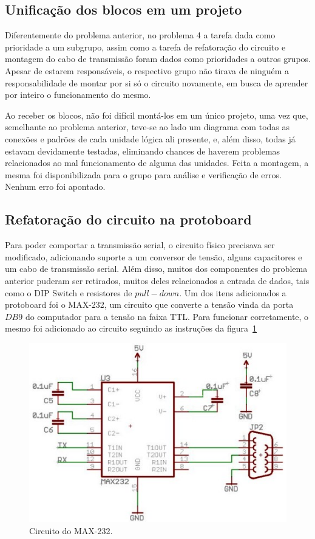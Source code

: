 \documentclass[12pt]{article}
\begin{document}
\subsection{Unificação dos blocos em um projeto}

Diferentemente do problema anterior, no problema 4 a tarefa dada como prioridade a um subgrupo, assim como a tarefa de refatoração do circuito e montagem do cabo de transmissão foram dados como prioridades a outros grupos. Apesar de estarem responsáveis, o respectivo grupo não tirava de ninguém a responsabilidade de montar por si só o circuito novamente, em busca de aprender por inteiro o funcionamento do mesmo.

Ao receber os blocos, não foi difícil montá-los em um único projeto, uma vez que, semelhante ao problema anterior, teve-se ao lado um diagrama com todas as conexões e padrões de cada unidade lógica ali presente, e, além disso, todas já estavam devidamente testadas, eliminando chances de haverem problemas relacionados ao mal funcionamento de alguma das unidades. Feita a montagem, a mesma foi disponibilizada para o grupo para análise e verificação de erros. Nenhum erro foi apontado.

\subsection{Refatoração do circuito na protoboard}

Para poder comportar a transmissão serial, o circuito físico precisava ser modificado, adicionando suporte a um conversor de tensão, alguns capacitores e um cabo de transmissão serial. Além disso, muitos dos componentes do problema anterior puderam ser retirados, muitos deles relacionados a entrada de dados, tais como o DIP Switch e resistores de $pull-down$. Um dos itens adicionados a protoboard foi o MAX-232, um circuito que converte a tensão vinda da porta $DB9$ do computador para a tensão na faixa TTL. Para funcionar corretamente, o mesmo foi adicionado ao circuito seguindo as instruções da figura~\ref{fig:max232}

\begin{figure}[!htbp]
\centering
\includegraphics[width=.8\textwidth]{img/p4/232.jpg}
\caption{Circuito do MAX-232.}
\label{fig:max232}
\end{figure}
\end{document}
